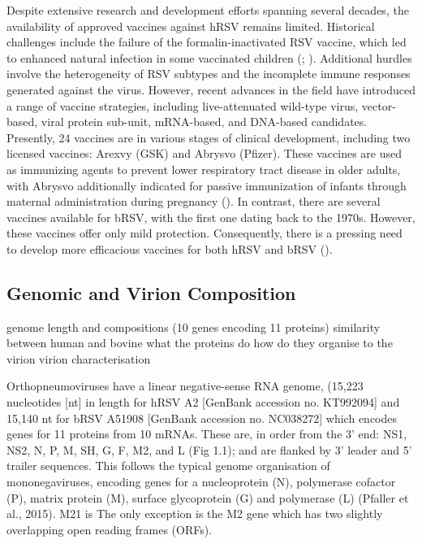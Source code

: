 Despite extensive research and development efforts spanning several decades, the availability of approved vaccines against hRSV remains limited. Historical challenges include the failure of the formalin-inactivated RSV vaccine, which led to enhanced natural infection in some vaccinated children (\cite{Fulginiti1969RespiratoryVaccine.}; \cite{Kim1969RespiratoryVaccine.}). Additional hurdles involve the heterogeneity of RSV subtypes and the incomplete immune responses generated against the virus. However, recent advances in the field have introduced a range of vaccine strategies, including live-attenuated wild-type virus, vector-based, viral protein sub-unit, mRNA-based, and DNA-based candidates. Presently, 24 vaccines are in various stages of clinical development, including two licensed vaccines: Arexvy (GSK) and Abrysvo (Pfizer). These vaccines are used as immunizing agents to prevent lower respiratory tract disease in older adults, with Abrysvo additionally indicated for passive immunization of infants through maternal administration during pregnancy (\cite{Topalidou2023RespiratoryVaccines}). In contrast, there are several vaccines available for bRSV, with the first one dating back to the 1970s. However, these vaccines offer only mild protection. Consequently, there is a pressing need to develop more efficacious vaccines for both hRSV and bRSV (\cite{Ellis2017HowCattle}).

\subsection{Genomic and Virion Composition} \label{subsec:Genomic and Virion Composition}

genome length and compositions (10 genes encoding 11 proteins)
similarity between human and bovine
what the proteins do
how do they organise to the virion
virion characterisation



Orthopneumoviruses have a linear negative-sense RNA genome, (15,223 nucleotides [nt] in length for hRSV A2 [GenBank accession no. KT992094] and 15,140 nt for bRSV A51908 [GenBank accession no. NC038272] which encodes genes for 11 proteins from 10 mRNAs. These are, in order from the 3' end: NS1, NS2, N, P, M, SH, G, F, M2, and L (Fig 1.1); and are flanked by 3' leader and 5' trailer sequences. This follows the typical genome organisation of mononegaviruses, encoding genes for a nucleoprotein (N), polymerase cofactor (P), matrix protein (M), surface glycoprotein (G) and polymerase (L) (Pfaller et al., 2015). M21 is The only exception is the M2 gene which has two slightly overlapping open reading frames (ORFs). 

